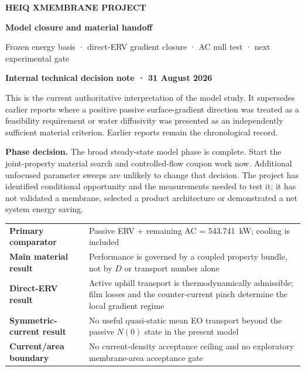 \documentclass[10pt,a4paper]{article}
\begin{document}
\thispagestyle{empty}
\vspace*{-10mm}
\begin{tcolorbox}[enhanced,colback=Navy,colframe=Navy,boxrule=0pt,
  arc=0mm,left=11mm,right=11mm,top=13mm,bottom=13mm,width=\textwidth]
  {\sffamily\bfseries\color{TealLight}\large HEIQ XMEMBRANE PROJECT}\par\vspace{7mm}
  {\raggedright\sffamily\bfseries\color{white}\fontsize{29}{33}\selectfont
  Model closure and material handoff\par}
  \vspace{4mm}
  {\sffamily\color{white!85}\fontsize{14}{18}\selectfont
  Frozen energy basis · direct-ERV gradient closure · AC null test · next experimental gate}
\end{tcolorbox}

\vspace{13mm}
{\sffamily\bfseries\fontsize{16}{20}\selectfont\color{Navy}Internal technical decision note · 31 August 2026}\par
\vspace{4mm}
{\fontsize{12}{17}\selectfont\color{Ink}
This is the current authoritative interpretation of the model study. It
supersedes earlier reports where a positive passive surface-gradient direction
was treated as a feasibility requirement or water diffusivity was presented as
an independently sufficient material criterion. Earlier reports remain the
chronological record.}

\vspace{8mm}
\begin{mainbox}
\textbf{Phase decision.} The broad steady-state model phase is complete.
Start the joint-property material search and controlled-flow coupon work now.
Additional unfocused parameter sweeps are unlikely to change that decision.
The project has identified conditional opportunity and the measurements needed
to test it; it has not validated a membrane, selected a product architecture or
demonstrated a net system energy saving.
\end{mainbox}

\vfill
\begin{tabularx}{\textwidth}{@{}p{43mm}Y@{}}
\textbf{Primary comparator} & Passive ERV + remaining AC = 543.741~kW; cooling is included \\
\textbf{Main material result} & Performance is governed by a coupled property bundle, not by $D$ or transport number alone \\
\textbf{Direct-ERV result} & Active uphill transport is thermodynamically admissible; film losses and the counter-current pinch determine the local gradient regime \\
\textbf{Symmetric-current result} & No useful quasi-static mean EO transport beyond the passive $N(0)$ state in the present model \\
\textbf{Current/area boundary} & No current-density acceptance ceiling and no exploratory membrane-area acceptance gate
\end{tabularx}
\end{document}
